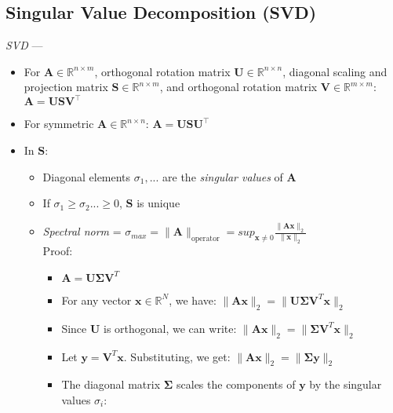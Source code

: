 \subsection*{Singular Value Decomposition (SVD)}
\emph{SVD} --- 
\begin{itemize}
    \item For $\boldsymbol{A} \in \mathbb{R}^{n \times m}$, orthogonal rotation matrix $\boldsymbol{U} \in \mathbb{R}^{n \times n}$, diagonal scaling and projection matrix $\boldsymbol{S} \in \mathbb{R}^{n \times m}$, and orthogonal rotation matrix $\boldsymbol{V} \in \mathbb{R}^{m \times m}$: $\boldsymbol{A} = \boldsymbol{U} \boldsymbol{S} \boldsymbol{V}^\intercal$
    \item For symmetric $\boldsymbol{A} \in \mathbb{R}^{n \times n}$: $\boldsymbol{A} = \boldsymbol{U} \boldsymbol{S} \boldsymbol{U}^\intercal$
    \item In $\boldsymbol{S}$:
    \begin{itemize}
        \item Diagonal elements $\sigma_1, ...$ are the \emph{singular values} of $\boldsymbol{A}$
        \item If $\sigma_1 \geq \sigma_2 ... \geq 0$, $\boldsymbol{S}$ is unique
        \item \emph{Spectral norm} = $\sigma_{max} = \| \boldsymbol{A} \|_{\textrm{operator}} = sup_{\boldsymbol{x} \neq 0} \frac{\|\boldsymbol{A}\boldsymbol{x}\|_2}{\|\boldsymbol{x}\|_2}$\\
        Proof:
        \begin{itemize}
            \item $\boldsymbol{A} = \boldsymbol{U} \boldsymbol{\Sigma} \boldsymbol{V}^T$
            \item For any vector $\boldsymbol{x} \in \mathbb{R}^N$, we have:
            $\|\boldsymbol{A}\boldsymbol{x}\|_2 = \|\boldsymbol{U} \boldsymbol{\Sigma} \boldsymbol{V}^T \boldsymbol{x}\|_2$
            \item Since $\boldsymbol{U}$ is orthogonal, we can write:
            $\|\boldsymbol{A}\boldsymbol{x}\|_2 = \|\boldsymbol{\Sigma} \boldsymbol{V}^T \boldsymbol{x}\|_2$
            \item Let $\boldsymbol{y} = \boldsymbol{V}^T \boldsymbol{x}$. Substituting, we get:
            $\|\boldsymbol{A}\boldsymbol{x}\|_2 = \|\boldsymbol{\Sigma} \boldsymbol{y}\|_2$ 
            \item The diagonal matrix $\boldsymbol{\Sigma}$ scales the components of $\boldsymbol{y}$ by the singular values $\sigma_i$:

\end{itemize}
\end{itemize}
\end{itemize}
